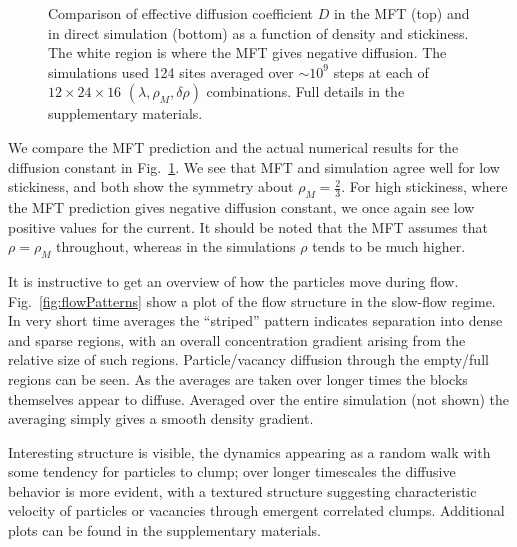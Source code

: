 \documentclass[
reprint, amsmath,amssymb,
]{revtex4-1}
\begin{document}
\begin{figure}[h!]
\begin{center}
\begin{tabular}{c}
    \end{tabular}
\end{center}
\caption{\label{fig:diffCoef}
Comparison of effective diffusion coefficient $D$ in the MFT (top) and in direct simulation (bottom) as a function of density and stickiness.
The white region is where the MFT gives negative diffusion. The simulations used 124 sites averaged over $\sim 10^9$ steps at each of $12 \times 24 \times 16 $ $(\lambda, \rho_M, \delta \rho)$ combinations.  
Full details in the supplementary materials.}
    \vspace{-2em}
\end{figure}

We compare the MFT prediction and the actual numerical results for the
diffusion constant in Fig.~\ref{fig:diffCoef}. We see that MFT and
simulation agree well for low stickiness, and both show the symmetry
about $\rho_M = \frac{2}{3}$. For high stickiness, where the MFT
prediction gives negative diffusion constant, we once again see low
positive values for the current.  It should be noted that the MFT
assumes that $\rho = \rho_M$ throughout, whereas in the simulations $\rho$ tends to be much higher.

It is instructive to get an overview of how the particles move during
flow. Fig.~\ref{fig:flowPatterns} show a plot of the flow structure in
the slow-flow regime.  In very short time averages the ``striped''
pattern indicates separation into dense and sparse regions, with an
overall concentration gradient arising from the relative size of such
regions.  Particle/vacancy diffusion through the empty/full regions
can be seen.  As the averages are taken over longer times the blocks themselves appear to diffuse.  Averaged over the entire simulation (not shown) the averaging simply gives a smooth density gradient.


Interesting structure is visible, the dynamics appearing as a random walk with
some tendency for particles to clump; over longer timescales the
diffusive behavior is more evident, with a textured structure
suggesting characteristic velocity of particles or vacancies through
emergent correlated clumps.  Additional plots can be found in the
supplementary materials.
\end{document}
